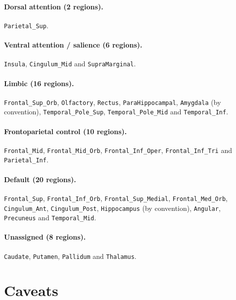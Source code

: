 \documentclass[a4paper,10pt]{article}
\newcommand{\aal}[1]{\texttt{#1}}
\begin{document}
\paragraph{Dorsal attention (2 regions).}
\aal{Parietal\_Sup}.

\paragraph{Ventral attention / salience (6 regions).}
\aal{Insula}, \aal{Cingulum\_Mid} and \aal{SupraMarginal}.

\paragraph{Limbic (16 regions).}
\aal{Frontal\_Sup\_Orb}, \aal{Olfactory}, \aal{Rectus}, \aal{ParaHippocampal}, \aal{Amygdala} (by convention), \aal{Temporal\_Pole\_Sup}, \aal{Temporal\_Pole\_Mid} and \aal{Temporal\_Inf}.

\paragraph{Frontoparietal control (10 regions).}
\aal{Frontal\_Mid}, \aal{Frontal\_Mid\_Orb}, \aal{Frontal\_Inf\_Oper}, \aal{Frontal\_Inf\_Tri} and \aal{Parietal\_Inf}.

\paragraph{Default (20 regions).}
\aal{Frontal\_Sup}, \aal{Frontal\_Inf\_Orb}, \aal{Frontal\_Sup\_Medial}, \aal{Frontal\_Med\_Orb}, \aal{Cingulum\_Ant}, \aal{Cingulum\_Post}, \aal{Hippocampus} (by convention), \aal{Angular}, \aal{Precuneus} and \aal{Temporal\_Mid}.

\paragraph{Unassigned (8 regions).}
\aal{Caudate}, \aal{Putamen}, \aal{Pallidum} and \aal{Thalamus}.

\section*{Caveats}
\end{document}
